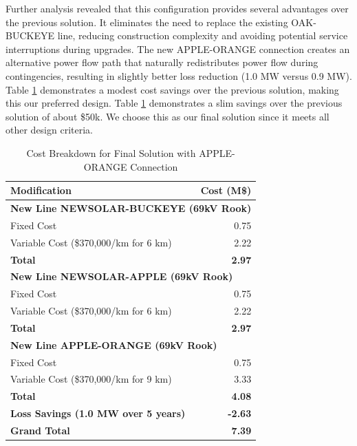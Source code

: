 \documentclass[conference]{IEEEtran}
\begin{document}
Further analysis revealed that this configuration provides several advantages over the previous solution. It eliminates the need to replace the existing OAK-BUCKEYE line, reducing construction complexity and avoiding potential service interruptions during upgrades. The new APPLE-ORANGE connection creates an alternative power flow path that naturally redistributes power flow during contingencies, resulting in slightly better loss reduction (1.0 MW versus 0.9 MW). Table \ref{tab:cost_breakdown_final} demonstrates a modest cost savings over the previous solution, making this our preferred design. Table \ref{tab:cost_breakdown_final} demonstrates a slim savings over the previous solution of about \$50k. We choose this as our final solution since it meets all other design criteria. 
\begin{table}[h!]
	\centering
	\begin{tabular}{|l|r|}
		\hline
		\textbf{Modification} & \textbf{Cost (M\$)} \\ \hline
		\multicolumn{2}{|l|}{\textbf{New Line NEWSOLAR-BUCKEYE (69kV Rook)}} \\ 
		\hspace{1em} Fixed Cost & 0.75 \\ 
		\hspace{1em} Variable Cost (\$370,000/km for 6 km) & 2.22 \\ 
		\hspace{1em} \textbf{Total} & \textbf{2.97} \\ \hline
		\multicolumn{2}{|l|}{\textbf{New Line NEWSOLAR-APPLE (69kV Rook)}} \\ 
		\hspace{1em} Fixed Cost & 0.75 \\ 
		\hspace{1em} Variable Cost (\$370,000/km for 6 km) & 2.22 \\ 
		\hspace{1em} \textbf{Total} & \textbf{2.97} \\ \hline
		\multicolumn{2}{|l|}{\textbf{New Line APPLE-ORANGE (69kV Rook)}} \\ 
		\hspace{1em} Fixed Cost & 0.75 \\ 
		\hspace{1em} Variable Cost (\$370,000/km for 9 km) & 3.33 \\ 
		\hspace{1em} \textbf{Total} & \textbf{4.08} \\ \hline
		\textbf{Loss Savings (1.0 MW over 5 years)} & \textbf{-2.63} \\ \hline
		\textbf{Grand Total} & \textbf{7.39} \\ \hline
	\end{tabular}
	\vspace{0.5em}
	\caption{Cost Breakdown for Final Solution with APPLE-ORANGE Connection}
	\label{tab:cost_breakdown_final}
\end{table}
\end{document}
